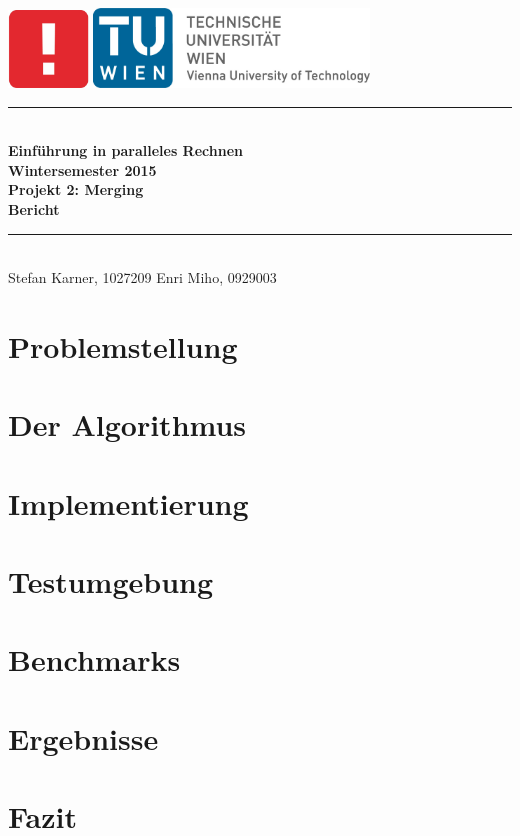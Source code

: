 \documentclass[a4paper,12pt]{article}
\begin{document}
\thispagestyle{empty}
\begin{center}
 \includegraphics[width=0.16\textwidth]{resources/informatik_logo}
\includegraphics[width=0.55\textwidth]{resources/tu_logo}\\[1cm]
\newcommand{\HRule}{\rule{\linewidth}{0.5mm}}
\HRule \\[0.4cm]
{ \Large \bfseries Einführung in paralleles Rechnen\\
Wintersemester 2015\\ [0.2cm]
Projekt 2: Merging \\ [0.2cm]
Bericht}\\[0.4cm]

\HRule \\[1.5cm]
{\large
Stefan Karner, 1027209 \hfill Enri Miho, 0929003
}
\end{center}

\newpage
\tableofcontents
\newpage
\section{Problemstellung}
	

\section{Der Algorithmus}
	

\section{Implementierung}
	

\section{Testumgebung}
	
	
\section{Benchmarks}
	
	
\section{Ergebnisse}
	
	
\section{Fazit}
	

\newpage


\end{document}

